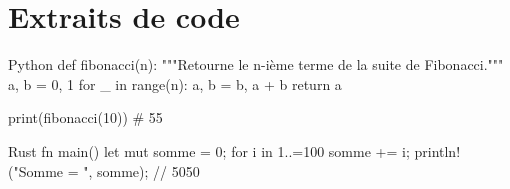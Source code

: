 \begin{liste}
\end{liste}

\section{Extraits de code}


\begin{extraitcode}{Python}
def fibonacci(n):
    """Retourne le n-ième terme de la suite de Fibonacci."""
    a, b = 0, 1
    for _ in range(n):
        a, b = b, a + b
    return a

print(fibonacci(10))  # 55
\end{extraitcode}


\begin{extraitcode}{Rust}
fn main() {
    let mut somme = 0;
    for i in 1..=100 {
        somme += i;
    }
    println!("Somme = {}", somme); // 5050
}
\end{extraitcode}
